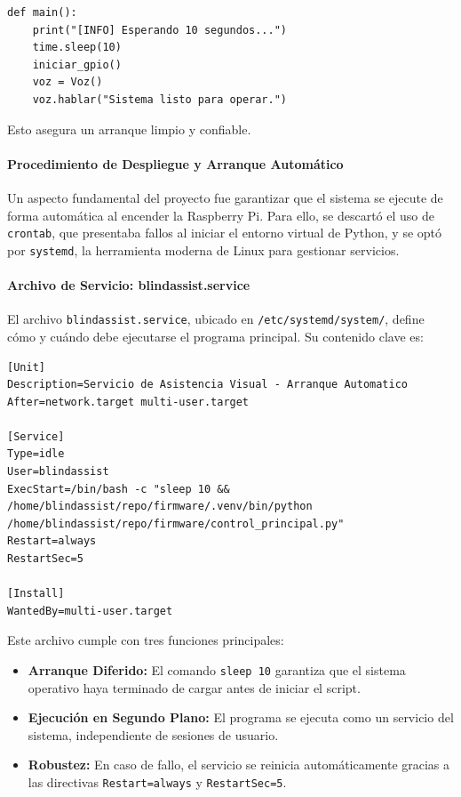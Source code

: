 \documentclass[12pt,a4paper]{article}
\begin{document}
\begin{verbatim}
def main():
    print("[INFO] Esperando 10 segundos...")
    time.sleep(10)
    iniciar_gpio()
    voz = Voz()
    voz.hablar("Sistema listo para operar.")
\end{verbatim}

Esto asegura un arranque limpio y confiable.

\paragraph{Procedimiento de Despliegue y Arranque Automático}

\begin{itemize}
Un aspecto fundamental del proyecto fue garantizar que el sistema se ejecute de forma automática al encender la Raspberry Pi. Para ello, se descartó el uso de \texttt{crontab}, que presentaba fallos al iniciar el entorno virtual de Python, y se optó por \texttt{systemd}, la herramienta moderna de Linux para gestionar servicios.
\end{itemize}

\paragraph{Archivo de Servicio: blindassist.service}

\begin{itemize}
El archivo \texttt{blindassist.service}, ubicado en \texttt{/etc/systemd/system/}, define cómo y cuándo debe ejecutarse el programa principal. Su contenido clave es:
\end{itemize}

\begin{verbatim}
[Unit]
Description=Servicio de Asistencia Visual - Arranque Automatico
After=network.target multi-user.target

[Service]
Type=idle
User=blindassist
ExecStart=/bin/bash -c "sleep 10 && 
/home/blindassist/repo/firmware/.venv/bin/python 
/home/blindassist/repo/firmware/control_principal.py"
Restart=always
RestartSec=5

[Install]
WantedBy=multi-user.target
\end{verbatim}

Este archivo cumple con tres funciones principales:
\begin{itemize}
    \item \textbf{Arranque Diferido:} El comando \texttt{sleep 10} garantiza que el sistema operativo haya terminado de cargar antes de iniciar el script.
    \item \textbf{Ejecución en Segundo Plano:} El programa se ejecuta como un servicio del sistema, independiente de sesiones de usuario.
    \item \textbf{Robustez:} En caso de fallo, el servicio se reinicia automáticamente gracias a las directivas \texttt{Restart=always} y \texttt{RestartSec=5}.
\end{itemize}
\end{document}
